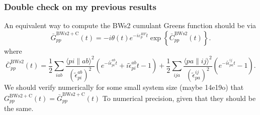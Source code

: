 \subsubsection{Double check on my previous results}
An equivalent way to compute the BWs2 cumulant Greens function should be via 
\begin{equation}
\bar{G}_{pp}^{\mathrm{BWs2+C}}(t) = -i \theta(t) e^{-i{\varepsilon}^{HF}_p t} \exp\left\{\bar{C}_{pp}^{\mathrm{BWs2}}(t)\right\}.
\end{equation}
where
\begin{equation}
    \bar{C}_{pp}^{\mathrm{BWs2}}(t) =     \frac{1}{2} \sum_{i a b}\frac{\langle p i \| a b\rangle^2 }{\left(\tilde{\epsilon}_{p i}^{a b}\right)^2}\left(e^{-i \tilde{\epsilon}_{p i}^{a b} t} +i \tilde{\epsilon}_{p i}^{a b} t -1 \right) 
    + \frac{1}{2}\sum_{i j a} \frac{\langle p a \| i j\rangle^2}{\left(\tilde{\epsilon}_{p a}^{i j}\right)^2} \left(e^{-i \tilde{\epsilon}_{p a}^{i j} t} - 1 \right).
\end{equation}
We should verify numerically for some small system size (maybe 14e19o) that $G_{pp}^{\mathrm{BWs2+C}}(t) = \bar{G}_{pp}^{\mathrm{BWs2+C}}(t)$ To numerical precision, given that they should be the same.
